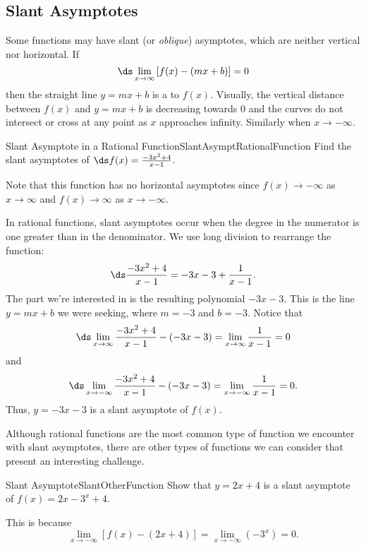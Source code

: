 \subsection{Slant Asymptotes}\label{subsec:SlantAsymptotes}
Some functions may have slant (or {\it oblique}) asymptotes, which are neither vertical nor horizontal. If
\[\ds\lim_{x\to\infty}\left[f(x)-(mx+b)\right]=0\]
then the straight line $y=mx+b$ is a  to $f(x)$. Visually, the vertical distance between $f(x)$ and $y=mx+b$ is decreasing towards 0 and the curves do not intersect or cross at any point as $x$ approaches infinity. Similarly when $x\to-\infty$.

\begin{example}{Slant Asymptote in a Rational Function}{SlantAsymptRationalFunction}
Find the slant asymptotes of $\ds f(x)=\frac{-3x^2+4}{x-1}$.
\end{example}
\begin{solution}
Note that this function has no horizontal asymptotes since $f(x)\to-\infty$ as $x\to\infty$ and $f(x)\to\infty$ as $x\to-\infty$.

In rational functions, slant asymptotes occur when the degree in the numerator is one greater than in the denominator. We use long division to rearrange the function:
\[\ds\frac{-3x^2+4}{x-1}=-3x-3+\frac{1}{x-1}.\]
The part we're interested in is the resulting polynomial $-3x-3$. This is the line $y=mx+b$ we were seeking, where $m=-3$ and $b=-3$. Notice that
\[\ds\lim_{x\to\infty}\frac{-3x^2+4}{x-1}-(-3x-3)=\lim_{x\to\infty}\frac{1}{x-1}=0\]
and
\[\ds\lim_{x\to-\infty}\frac{-3x^2+4}{x-1}-(-3x-3)=\lim_{x\to-\infty}\frac{1}{x-1}=0.\]
Thus, $y=-3x-3$ is a slant asymptote of $f(x)$.
\end{solution}

Although rational functions are the most common type of function we encounter with slant asymptotes, there are other types of functions we can consider that present an interesting challenge.

\begin{example}{Slant Asymptote}{SlantOtherFunction}
Show that $y=2x+4$ is a slant asymptote of $f(x)=2x-3^x+4$.
\end{example}
\begin{solution}
This is because  
\[\lim_{x\to -\infty}[f(x)-(2x+4)]=\lim_{x\to -\infty}(-3^x)=0.\]
\end{solution}

